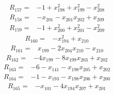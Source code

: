 \begin{equation*}\begin{split}
R_{157}={}&-1 + x_{198}^{2} + x_{199}^{2} - x_{208}^{2}
\end{split}\end{equation*}
\begin{equation*}\begin{split}
R_{158}={}&-x_{201} - x_{201} x_{202} + x_{209}
\end{split}\end{equation*}
\begin{equation*}\begin{split}
R_{159}={}&-1 + x_{200}^{2} + x_{201}^{2} - x_{209}^{2}
\end{split}\end{equation*}
\begin{equation*}\begin{split}
R_{160}={}&-x_{194}^{2} + x_{210}
\end{split}\end{equation*}
\begin{equation*}\begin{split}
R_{161}={}&x_{199} - 2x_{204} x_{210} - x_{210}
\end{split}\end{equation*}
\begin{equation*}\begin{split}
R_{162}={}&-4x_{199} - 8x_{199} x_{203} + x_{202}
\end{split}\end{equation*}
\begin{equation*}\begin{split}
R_{163}={}&-6 - x_{141} - x_{198} x_{205} + x_{202}
\end{split}\end{equation*}
\begin{equation*}\begin{split}
R_{164}={}&-1 - x_{193} - x_{198} x_{206} + x_{200}
\end{split}\end{equation*}
\begin{equation*}\begin{split}
R_{165}={}&-x_{101} - 4x_{194} x_{207} + x_{201}
\end{split}\end{equation*}
